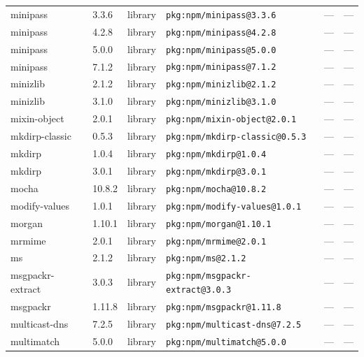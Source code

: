 \documentclass[11pt,a4paper]{article}
\begin{document}
\begin{longtable}{|p{4cm}|p{2cm}|p{1.6cm}|p{5cm}|p{1.5cm}|p{3.5cm}|}
\raggedright minipass & 3.3.6 & library & \small\texttt{pkg:npm/minipass@3.3.6} & — & \small — \\
\raggedright minipass & 4.2.8 & library & \small\texttt{pkg:npm/minipass@4.2.8} & — & \small — \\
\raggedright minipass & 5.0.0 & library & \small\texttt{pkg:npm/minipass@5.0.0} & — & \small — \\
\raggedright minipass & 7.1.2 & library & \small\texttt{pkg:npm/minipass@7.1.2} & — & \small — \\
\raggedright minizlib & 2.1.2 & library & \small\texttt{pkg:npm/minizlib@2.1.2} & — & \small — \\
\raggedright minizlib & 3.1.0 & library & \small\texttt{pkg:npm/minizlib@3.1.0} & — & \small — \\
\raggedright mixin-object & 2.0.1 & library & \small\texttt{pkg:npm/mixin-object@2.0.1} & — & \small — \\
\raggedright mkdirp-classic & 0.5.3 & library & \small\texttt{pkg:npm/mkdirp-classic@0.5.3} & — & \small — \\
\raggedright mkdirp & 1.0.4 & library & \small\texttt{pkg:npm/mkdirp@1.0.4} & — & \small — \\
\raggedright mkdirp & 3.0.1 & library & \small\texttt{pkg:npm/mkdirp@3.0.1} & — & \small — \\
\raggedright mocha & 10.8.2 & library & \small\texttt{pkg:npm/mocha@10.8.2} & — & \small — \\
\raggedright modify-values & 1.0.1 & library & \small\texttt{pkg:npm/modify-values@1.0.1} & — & \small — \\
\raggedright morgan & 1.10.1 & library & \small\texttt{pkg:npm/morgan@1.10.1} & — & \small — \\
\raggedright mrmime & 2.0.1 & library & \small\texttt{pkg:npm/mrmime@2.0.1} & — & \small — \\
\raggedright ms & 2.1.2 & library & \small\texttt{pkg:npm/ms@2.1.2} & — & \small — \\
\raggedright msgpackr-extract & 3.0.3 & library & \small\texttt{pkg:npm/msgpackr-extract@3.0.3} & — & \small — \\
\raggedright msgpackr & 1.11.8 & library & \small\texttt{pkg:npm/msgpackr@1.11.8} & — & \small — \\
\raggedright multicast-dns & 7.2.5 & library & \small\texttt{pkg:npm/multicast-dns@7.2.5} & — & \small — \\
\raggedright multimatch & 5.0.0 & library & \small\texttt{pkg:npm/multimatch@5.0.0} & — & \small — \\

\end{longtable}
\end{document}
